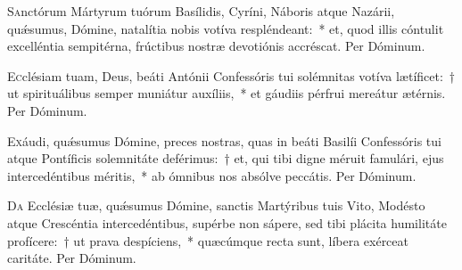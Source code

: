 \documentclass[vesperale_romanum.tex]{subfiles}
\begin{document}
\oratio
\lettrine{S}{a}nctórum Mártyrum tuórum Basílidis, Cyríni, Náboris atque Nazárii, quǽsumus, Dómine, natalítia nobis votíva respléndeant:~* et, quod illis cóntulit excelléntia sempitérna, frú\-ctibus nostræ devotiónis accréscat. Per Dóminum.

\capitdeseq

\myrule
\newpage


\duplex



\oratio

\lettrine{E}{c}clésiam tuam, Deus, beáti Antónii Confessóris tui solé\-mnitas votíva lætíficet:~† ut spirituálibus semper muniátur auxíliis,~* et gáudiis pérfrui mereátur ætérnis. Per Dóminum.

\capitdeseq

\myrule


\duplexmtv

\odoctoroptime

\oratio

\lettrine{E}{x}áudi, quǽsumus Dómine, preces nostras, quas in beáti Basilíi Confessóris tui atque Pontíficis sole\-mnitáte deférimus:~† et, qui tibi digne méruit famulári, ejus intercedéntibus méritis,~* ab ómnibus nos absólve peccátis. Per Dóminum.

\hicvir

\commsequentis
\myrule
{}


\oratio

\lettrine{D}{a} Ecclésiæ tuæ, quǽsumus Dómine, san\-ctis Martýribus tuis Vito, Modésto atque Crescéntia intercedéntibus, supérbe non sápere, sed tibi plácita humilitáte profícere:~† ut prava despíciens,~* quæcúmque re\-cta sunt, líbera exérceat caritáte. Per Dóminum.
\end{document}
